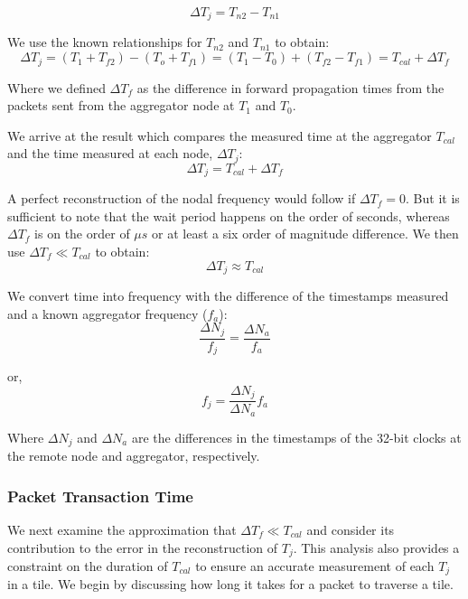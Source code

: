 \begin{equation}
  \Delta T_{j} = T_{n2} - T_{n1}
\end{equation}

We use the known relationships for $T_{n2}$ and $T_{n1}$ to obtain:
\begin{equation}
  \Delta T_{j} = (T_{1} + T_{f2}) - (T_{o} + T_{f1}) = (T_{1} - T_{0}) + (T_{f2} - T_{f1}) = T_{cal} + \Delta T_{f}
\end{equation}

Where we defined $\Delta T_{f}$ as the difference in forward propagation times from the packets sent from the aggregator node at $T_{1}$ and $T_{0}$.

We arrive at the result which compares the measured time at the aggregator $T_{cal}$ and the time measured at each node, $\Delta T_{j}$:
\begin{equation}
  \Delta T_{j} = T_{cal} + \Delta T_{f}
\end{equation}

A perfect reconstruction of the nodal frequency would follow if $\Delta T_{f} = 0$.
But it is sufficient to note that the wait period happens on the order of seconds, whereas $\Delta T_{f}$ is on the order of $\mu s$ or at least a six order of magnitude difference.
We then use $\Delta T_{f} \ll T_{cal}$ to obtain:
\begin{equation}
  \Delta T_{j} \approx T_{cal}
\end{equation}

We convert time into frequency with the difference of the timestamps measured and a known aggregator frequency ($f_{a}$):
\begin{equation}
   \frac{\Delta N_{j}}{f_{j}} = \frac{\Delta N_{a}}{f_{a}}
\end{equation}

or,
\begin{equation}
   \boxed{f_{j} = \frac{\Delta N_{j}}{\Delta N_{a}}f_{a}}
\end{equation}

Where $\Delta N_{j}$ and $\Delta N_{a}$ are the differences in the timestamps of the 32-bit clocks at the remote node and aggregator, respectively.


\subsubsection{Packet Transaction Time}

 We next examine the approximation that $\Delta T_{f} \ll T_{cal}$ and consider its contribution to the error in the reconstruction of $T_{j}$.
This analysis also provides a constraint on the duration of $T_{cal}$ to ensure an accurate measurement of each $T_{j}$ in a tile.
We begin by discussing how long it takes for a packet to traverse a tile.

